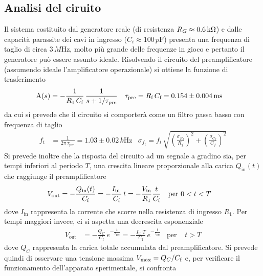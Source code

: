 \subsection{Analisi del ciruito}\label{sec:preamp_analisi}
Il sistema costituito dal generatore reale (di resistenza
$R_{G}\approx 0.6\kOhm$) e dalle capacità parassite dei cavi in ingresso
($C_{i}\approx 100\,\si{p\farad} $)  presenta una frequenza di taglio di circa
$3 \,\si{M\Hz}$, molto più grande delle frequenze in gioco e pertanto il
generatore può essere assunto ideale.
Risolvendo il circuito del preamplificatore (assumendo ideale l'amplificatore
operazionale) si ottiene la funzione di
trasferimento
\begin{align}\label{eq:preamp_tau}
  \text{A}(s) &= - \frac{1}{R_{1}\,C_{\text{f}}} \, \frac{1}{s+1/\tau_{\text{pre}}}
  &
    \tau_{\text{pre}} &=R_{\text f}\, C_{\text f}=0.154 \pm 0.004\,\si{\milli\second}
\end{align}
da cui si prevede che il circuito si comporterà come un filtro passa basso con
frequenza di taglio
\begin{align}\label{eq:preamp_ft}
  f_{t}&=\frac{1}{2\pi\,\tau_{\text{pre}}}=1.03\pm 0.02\,\si{k\Hz}
  &
    \sigma_{f_{t}}=f_{t}\, \sqrt{
    {\left(\frac{\sigma_{R_{f}}}{R_{f}}\right)}^{2}+
    {\left(\frac{\sigma_{C_{f}}}{C_{f}}\right)}^{2}}
\end{align}
Si prevede inoltre che la risposta del circuito ad un segnale a gradino
sia, per tempi inferiori al periodo $T$, una crescita lineare proporzionale
alla carica $Q_{\text{in}}(t)$ che raggiunge il preamplificatore
\begin{align}\label{eq:preamp_vout}
  V_{\text{out}}& = - \frac{Q_{\inp}(t)}{C_{\text f}} = - \frac{I_{\text{in}}\,}
                  {C_{\text f}}\,t = -\frac{V_{\inp}}{R_{1}}\frac{t}{C_{\text f}}
  &
  \text{per }& 0 < t < T
\end{align}
dove $I_{\text{in}}$ rappresenta la corrente che scorre nella resistenza di
ingresso $R_{1}$.
Per tempi maggiori invece, ci si aspetta una decrescita esponenziale
\begin{align}\label{eq:preamp_vout_exp}
  V_{\text{out}}& = - \frac{Q_{C}}{C_{\text{f}}}\,e^{-\frac{t}{\tau_{\text{pre}}}}=
                  - \frac{I_{\text{in}}\,T}{C_{\text{f}}}\,e^{-\frac{t}{\tau_{\text{pre}}}}
  &
   \text{per }& t> T
\end{align}
dove $Q_{C}$ rappresenta la carica totale accumulata dal preamplificatore.
Si prevede quindi di osservare una tensione massima $V_{\text{max}}=Q_{C}/C_{\text f}$ e, per verificare il funzionamento dell'apparato sperimentale, si confronta
